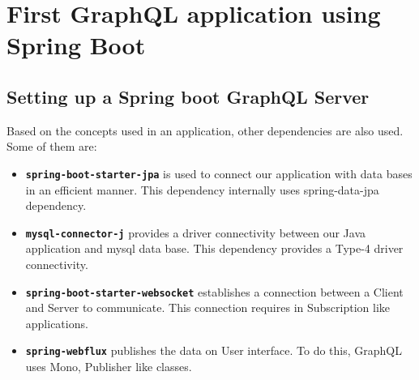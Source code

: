 \documentclass[../main.tex]{subfiles}
\begin{document}
\chapter{First GraphQL application using Spring Boot}

\section{Setting up a Spring boot GraphQL Server}
Based on the concepts used in an application, other dependencies are also used. Some of them are:
\begin{itemize}
  \item {\textbf{\lstinline{spring-boot-starter-jpa}} is used to connect our application with data bases in an efficient manner. This dependency internally uses spring-data-jpa dependency.}
  \item {\textbf{\lstinline{mysql-connector-j}} provides a driver connectivity between our Java application and mysql data base. This dependency provides a Type-4 driver connectivity.}
  \item {\textbf{\lstinline{spring-boot-starter-websocket}} establishes a connection between a Client and Server to communicate. This connection requires in Subscription like applications.}
  \item {\textbf{\lstinline{spring-webflux}} publishes the data on User interface. To do this, GraphQL uses Mono, Publisher like classes.}
\end{itemize}
\printglossaries
\end{document}

